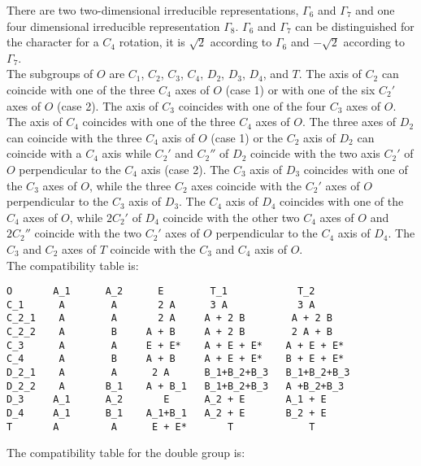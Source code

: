 \documentclass[12pt,a4paper,twoside]{report}
\begin{document}
There are two two-dimensional irreducible representations, $\Gamma_6$ and
$\Gamma_7$ and one four dimensional irreducible representation $\Gamma_8$.
$\Gamma_6$ and $\Gamma_7$ can be distinguished for the character for a
$C_4$ rotation, it is $\sqrt{2}$ according to $\Gamma_6$ and $-\sqrt{2}$
according to $\Gamma_7$. \\
The subgroups of $O$ are $C_1$, $C_2$, $C_3$, $C_4$, $D_2$, $D_3$, $D_4$, and 
$T$. The axis of $C_2$ can coincide with one of the three $C_4$ axes of $O$
(case 1) or with one of the six $C_2'$ axes of $O$ (case 2). The axis of $C_3$ 
coincides with one of the four $C_3$ axes of $O$. The axis of $C_4$ 
coincides with one of the three $C_4$ axes of $O$. The three axes of $D_2$
can coincide with the three $C_4$ axis of $O$ (case 1) or the $C_2$ axis of
$D_2$ can coincide with a $C_4$ axis while $C_2'$ and $C_2''$ of $D_2$ 
coincide with the two axis $C_2'$ of $O$ perpendicular to the $C_4$ axis 
(case 2). The $C_3$ axis of $D_3$ coincides with one of the $C_3$ axes of $O$, while
the three $C_2$ axes coincide with the $C_2'$ axes of $O$ perpendicular to
the $C_3$ axis of $D_3$. The $C_4$ axis of $D_4$ coincides with one of the $C_4$
axes of $O$, while $2C_2'$ of $D_4$ coincide with the other two $C_4$ 
axes of $O$ and $2C_2''$ coincide with the two $C_2'$ axes of $O$ perpendicular
to the $C_4$ axis of $D_4$. The $C_3$ and $C_2$ axes of $T$ coincide with
the $C_3$ and $C_4$ axis of $O$. \\
The compatibility table is:

\begin{tcolorbox}
\begin{footnotesize}
\begin{verbatim}
O       A_1      A_2      E        T_1            T_2
C_1      A        A       2 A      3 A            3 A
C_2_1    A        A       2 A     A + 2 B        A + 2 B
C_2_2    A        B     A + B     A + 2 B        2 A + B
C_3      A        A     E + E*    A + E + E*    A + E + E*
C_4      A        B     A + B     A + E + E*    B + E + E*
D_2_1    A        A      2 A      B_1+B_2+B_3   B_1+B_2+B_3 
D_2_2    A       B_1    A + B_1   B_1+B_2+B_3   A +B_2+B_3
D_3     A_1      A_2       E      A_2 + E       A_1 + E
D_4     A_1      B_1    A_1+B_1   A_2 + E       B_2 + E
T       A         A      E + E*       T             T
\end{verbatim}
\end{footnotesize}
\end{tcolorbox}

The compatibility table for the double group is:
\end{document}
